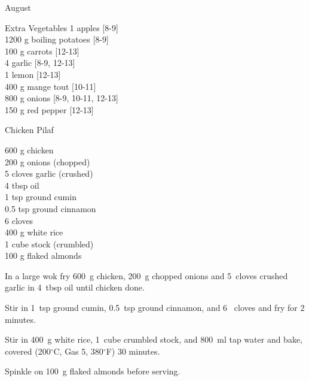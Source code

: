 \begin{menu}{August}
      \begin{shoppinglist}{Extra Vegetables}
      1  apples 
        {\scriptsize[8-9]}\\
      1200 g boiling potatoes 
        {\scriptsize[8-9]}\\
      100 g carrots 
        {\scriptsize[12-13]}\\
      4  garlic 
        {\scriptsize[8-9, 12-13]}\\
      1  lemon 
        {\scriptsize[12-13]}\\
      400 g mange tout 
        {\scriptsize[10-11]}\\
      800 g onions 
        {\scriptsize[8-9, 10-11, 12-13]}\\
      150 g red pepper 
        {\scriptsize[12-13]}\\
      \end{shoppinglist}%
      \par\vfil %
    \vfil\clearpage
  
    \begin{recipe}{2}{Chicken Pilaf}%
		\begin{ingredients}
		600 g chicken  \\
	200 g onions (chopped) \\
	5 cloves garlic (crushed) \\
	4 tbsp oil  \\
	1 tsp ground cumin  \\
	0.5 tsp ground cinnamon  \\
	6  cloves  \\
	400 g white rice  \\
	1 cube stock (crumbled) \\
	100 g flaked almonds  \\
	
		\end{ingredients}
	
    \begin{instructions}
    \item 
        In a large wok fry
        600~g  chicken,
        200~g chopped onions
        and
        5~cloves crushed garlic
        in
        4~tbsp  oil
        until chicken done.
      \item 
        Stir in
        1~tsp  ground cumin,
        0.5~tsp  ground cinnamon,
        and
        6~  cloves
        and fry for 2 minutes.
      \item 
        Stir in
        400~g  white rice,
        1~cube crumbled stock,
        and
        800~ml  tap water
        and bake, covered (200$^{\circ}$C, Gas 5, 380$^{\circ}$F) 30 minutes.
      \item 
        Spinkle on
        100~g  flaked almonds
        before serving.
      

\end{instructions}
\end{recipe}
\end{menu}
